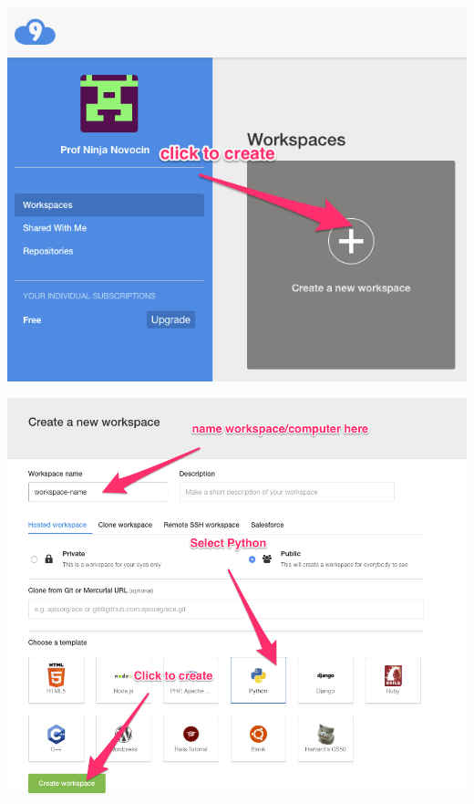 \documentclass[12pt]{book}
\begin{document}
\begin{center}
\includegraphics[width=\textwidth,height=\textheight,keepaspectratio]{create_workspace}
\end{center}

\begin{center}
\includegraphics[width=\textwidth,height=\textheight,keepaspectratio]{Create_a_New_Workspace}
\end{center}
\end{document}
